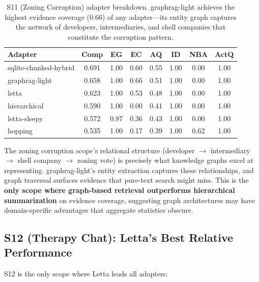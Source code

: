 \documentclass[11pt,letterpaper]{article}
\begin{document}
\begin{table}[H]
\centering
\small
\begin{tabular}{lccccccc}
\toprule
\textbf{Adapter} & \textbf{Comp} & \textbf{EG} & \textbf{EC} & \textbf{AQ} & \textbf{ID} & \textbf{NBA} & \textbf{ActQ} \\
\midrule
\rowcolor{toprow}
sqlite-chunked-hybrid & 0.691 & 1.00 & 0.60 & 0.55 & 1.00 & 0.00 & 1.00 \\
graphrag-light & 0.658 & 1.00 & 0.66 & 0.51 & 1.00 & 0.00 & 1.00 \\
letta & 0.623 & 1.00 & 0.53 & 0.48 & 1.00 & 0.00 & 1.00 \\
hierarchical & 0.590 & 1.00 & 0.00 & 0.41 & 1.00 & 0.00 & 1.00 \\
letta-sleepy & 0.572 & 0.87 & 0.36 & 0.43 & 1.00 & 0.00 & 1.00 \\
hopping & 0.535 & 1.00 & 0.17 & 0.39 & 1.00 & 0.62 & 1.00 \\
\bottomrule
\end{tabular}
\caption{S11 (Zoning Corruption) adapter breakdown. graphrag-light achieves the highest evidence coverage (0.66) of any adapter---its entity graph captures the network of developers, intermediaries, and shell companies that constitute the corruption pattern.}
\label{tab:s11-detail}
\end{table}

The zoning corruption scope's relational structure (developer $\to$ intermediary $\to$ shell company $\to$ zoning vote) is precisely what knowledge graphs excel at representing. graphrag-light's entity extraction captures these relationships, and graph traversal surfaces evidence that pure-text search might miss. This is the \textbf{only scope where graph-based retrieval outperforms hierarchical summarization} on evidence coverage, suggesting graph architectures may have domain-specific advantages that aggregate statistics obscure.

\subsection{S12 (Therapy Chat): Letta's Best Relative Performance}

S12 is the only scope where Letta leads all adapters:
\end{document}
